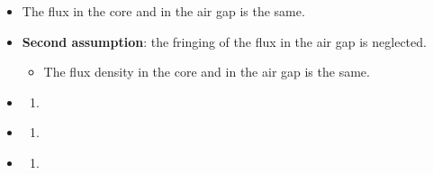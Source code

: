 \begin{ELjoin}
\begin{ELexample}{}
\begin{ELsolution}
\begin{itemize}
\tightlist
\item
  The flux in the core and in the air gap is the same.
\item
  \textbf{Second assumption}: the fringing of the flux in the air gap is neglected.

  \begin{itemize}
  \tightlist
  \item
    The flux density in the core and in the air gap is the same.
  \end{itemize}
\end{itemize}


\begin{itemize}
\item
  \begin{enumerate}
  \def\labelenumi{(\alph{enumi})}
  \tightlist
  \item
  \end{enumerate}
\end{itemize}


\begin{itemize}
\item
  \begin{enumerate}
  \def\labelenumi{(\alph{enumi})}
  \setcounter{enumi}{1}
  \tightlist
  \item
  \end{enumerate}
\end{itemize}


\begin{itemize}
\item
  \begin{enumerate}
  \def\labelenumi{(\alph{enumi})}
  \setcounter{enumi}{2}
  \tightlist
  \item
  \end{enumerate}
\end{itemize}


\end{ELsolution}

\end{ELexample}

\end{ELjoin}

